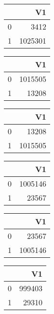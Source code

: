 \bigskip\bigskip
\centering
\begin{tabular}{rr}
  \hline
 & V1 \\ 
  \hline
0 & 3412 \\ 
  1 & 1025301 \\ 
   \hline
\end{tabular}

\bigskip\bigskip
\centering
\begin{tabular}{rr}
  \hline
 & V1 \\ 
  \hline
0 & 1015505 \\ 
  1 & 13208 \\ 
   \hline
\end{tabular}

\bigskip\bigskip
\centering
\begin{tabular}{rr}
  \hline
 & V1 \\ 
  \hline
0 & 13208 \\ 
  1 & 1015505 \\ 
   \hline
\end{tabular}

\bigskip\bigskip
\centering
\begin{tabular}{rr}
  \hline
 & V1 \\ 
  \hline
0 & 1005146 \\ 
  1 & 23567 \\ 
   \hline
\end{tabular}

\bigskip\bigskip
\centering
\begin{tabular}{rr}
  \hline
 & V1 \\ 
  \hline
0 & 23567 \\ 
  1 & 1005146 \\ 
   \hline
\end{tabular}

\bigskip\bigskip
\centering
\begin{tabular}{rr}
  \hline
 & V1 \\ 
  \hline
0 & 999403 \\ 
  1 & 29310 \\ 
   \hline
\end{tabular}

